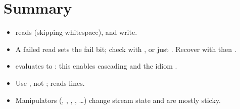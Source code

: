 \section*{Summary}
\begin{itemize}
  \item {} reads (skipping whitespace),  and
         write.
  \item A failed read sets the fail bit; check with ,
         or just . Recover with
         then .
  \item {} evaluates to : this enables cascading and the
        idiom .
  \item Use , not ;  reads lines.
  \item Manipulators (, , ,
        , \dots) change stream state and are mostly sticky.
\end{itemize}
